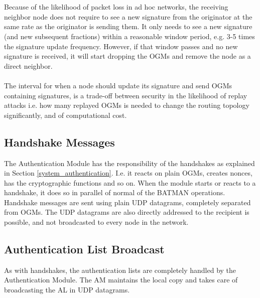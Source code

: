 \\\\
Because of the likelihood of packet loss in ad hoc networks, the receiving neighbor node does not require to see a new signature from the originator at the same rate as the originator is sending them. It only needs to see a new signature (and new subsequent fractions) within a reasonable window period, e.g. 3-5 times the signature update frequency. However, if that window passes and no new signature is received, it will start dropping the OGMs and remove the node as a direct neighbor. 
\\\\
The interval for when a node should update its signature and send OGMs containing signatures, is a trade-off between security in the likelihood of replay attacks i.e. how many replayed OGMs is needed to change the routing topology significantly, and of computational cost.

\subsection{Handshake Messages} \label{am_handshake}
The Authentication Module has the responsibility of the handshakes as explained in Section \ref{system_authentication}. I.e. it reacts on plain OGMs, creates nonces, has the cryptographic functions and so on. When the module starts or reacts to a handshake, it does so in parallel of normal of the BATMAN operations. Handshake messages are sent using plain UDP datagrams, completely separated from OGMs. The UDP datagrams are also directly addressed to the recipient is possible, and not broadcasted to every node in the network.

\subsection{Authentication List Broadcast}
As with handshakes, the authentication lists are completely handled by the Authentication Module. The AM maintains the local copy and takes care of broadcasting the AL in UDP datagrams. %

